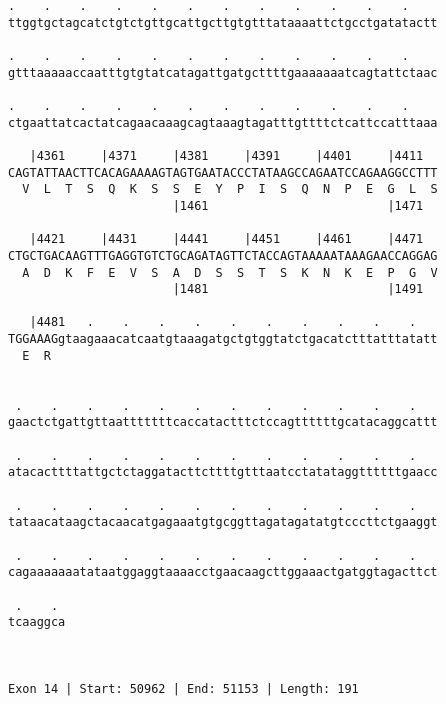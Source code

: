 \documentclass{article}
\begin{document}
\begin{Verbatim}
.    .    .    .    .    .    .    .    .    .    .    .    
ttggtgctagcatctgtctgttgcattgcttgtgtttataaaattctgcctgatatactt
                                                            
.    .    .    .    .    .    .    .    .    .    .    .    
gtttaaaaaccaatttgtgtatcatagattgatgcttttgaaaaaaatcagtattctaac
                                                            
.    .    .    .    .    .    .    .    .    .    .    .    
ctgaattatcactatcagaacaaagcagtaaagtagatttgttttctcattccatttaaa
                                                            
   |4361     |4371     |4381     |4391     |4401     |4411  
CAGTATTAACTTCACAGAAAAGTAGTGAATACCCTATAAGCCAGAATCCAGAAGGCCTTT
  V  L  T  S  Q  K  S  S  E  Y  P  I  S  Q  N  P  E  G  L  S
                       |1461                         |1471  
  
   |4421     |4431     |4441     |4451     |4461     |4471  
CTGCTGACAAGTTTGAGGTGTCTGCAGATAGTTCTACCAGTAAAAATAAAGAACCAGGAG
  A  D  K  F  E  V  S  A  D  S  S  T  S  K  N  K  E  P  G  V
                       |1481                         |1491  
  
   |4481   .    .    .    .    .    .    .    .    .    .   
TGGAAAGgtaagaaacatcaatgtaaagatgctgtggtatctgacatctttatttatatt
  E  R                                                      
                                                            
  
 .    .    .    .    .    .    .    .    .    .    .    .   
gaactctgattgttaatttttttcaccatactttctccagttttttgcatacaggcattt
                                                            
 .    .    .    .    .    .    .    .    .    .    .    .   
atacacttttattgctctaggatacttcttttgtttaatcctatataggttttttgaacc
                                                            
 .    .    .    .    .    .    .    .    .    .    .    .   
tataacataagctacaacatgagaaatgtgcggttagatagatatgtcccttctgaaggt
                                                            
 .    .    .    .    .    .    .    .    .    .    .    .   
cagaaaaaaatataatggaggtaaaacctgaacaagcttggaaactgatggtagacttct
                                                            
 .    . 
tcaaggca
        
        
 
Exon 14 | Start: 50962 | End: 51153 | Length: 191




\end{Verbatim}
\end{document}
